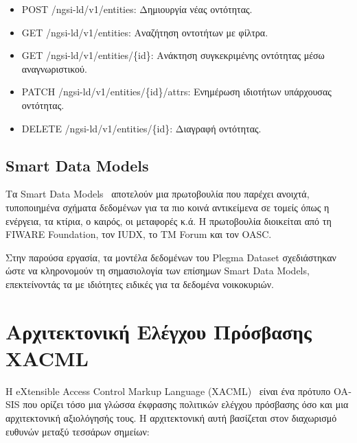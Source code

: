 \begin{itemize}
    \item \textlatin{POST /ngsi-ld/v1/entities}: Δημιουργία νέας
    οντότητας.
    \item \textlatin{GET /ngsi-ld/v1/entities}: Αναζήτηση οντοτήτων με
    φίλτρα.
    \item \textlatin{GET /ngsi-ld/v1/entities/\{id\}}: Ανάκτηση
    συγκεκριμένης οντότητας μέσω αναγνωριστικού.
    \item \textlatin{PATCH /ngsi-ld/v1/entities/\{id\}/attrs}:
    Ενημέρωση ιδιοτήτων υπάρχουσας οντότητας.
    \item \textlatin{DELETE /ngsi-ld/v1/entities/\{id\}}: Διαγραφή
    οντότητας.
\end{itemize}

\subsection{\textlatin{Smart Data Models}}
\label{subsec:smart-data-models}

Τα \textlatin{Smart Data Models}~\cite{smart-data-models2023}
αποτελούν μια πρωτοβουλία που παρέχει ανοιχτά, τυποποιημένα σχήματα
δεδομένων για τα πιο κοινά αντικείμενα σε τομείς όπως η ενέργεια, τα
κτίρια, ο καιρός, οι μεταφορές κ.ά. Η πρωτοβουλία διοικείται
από τη \textlatin{FIWARE Foundation}, τον \textlatin{IUDX}, το
\textlatin{TM Forum} και τον \textlatin{OASC}.

Στην παρούσα εργασία, τα μοντέλα δεδομένων του \textlatin{Plegma
Dataset} σχεδιάστηκαν ώστε να κληρονομούν τη σημασιολογία των
επίσημων \textlatin{Smart Data Models}, επεκτείνοντάς τα με ιδιότητες
ειδικές για τα δεδομένα νοικοκυριών.

\section{Αρχιτεκτονική Ελέγχου Πρόσβασης \textlatin{XACML}}
\label{sec:xacml}

Η \textlatin{eXtensible Access Control Markup Language
(XACML)}~\cite{xacml3} είναι ένα πρότυπο \textlatin{OASIS} που ορίζει
τόσο μια γλώσσα έκφρασης πολιτικών ελέγχου πρόσβασης όσο και μια
αρχιτεκτονική αξιολόγησής τους. Η αρχιτεκτονική αυτή βασίζεται στον
διαχωρισμό ευθυνών μεταξύ τεσσάρων σημείων:

